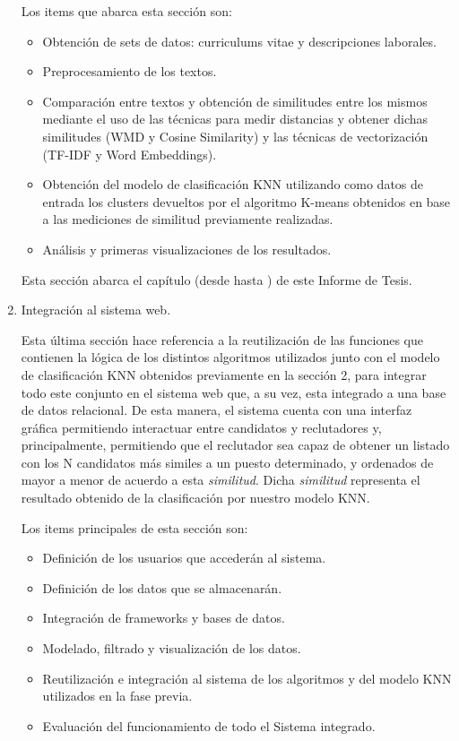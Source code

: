 \documentclass[12pt,a4paper]{article}
\begin{document}
\begin{sloppypar}
\begin{enumerate}
\cleardoublepage    %

Los items que abarca esta sección son:

\begin{itemize}
	\item Obtención de sets de datos: curriculums vitae y descripciones laborales. 
	\item Preprocesamiento de los textos.
	\item Comparación entre textos y obtención de similitudes entre los mismos mediante el uso de las técnicas para medir distancias y obtener dichas similitudes (WMD y Cosine Similarity) y las técnicas de vectorización (TF-IDF y Word Embeddings).
	\item Obtención del modelo de clasificación KNN utilizando como datos de entrada los clusters devueltos por el algoritmo K-means obtenidos en base a las mediciones de similitud previamente realizadas.
	\item Análisis y primeras visualizaciones de los resultados.
\end{itemize} 
 
Esta sección abarca el capítulo \textit{} (desde \textit{} hasta \textit{}) de este Informe de Tesis. \\

\item Integración al sistema web.

Esta última sección hace referencia a la reutilización de las funciones que contienen la lógica de los distintos algoritmos utilizados junto con el modelo de clasificación KNN obtenidos previamente en la sección 2, para integrar todo este conjunto en el sistema web que, a su vez, esta integrado a una base de datos relacional. De esta manera, el sistema cuenta con una interfaz gráfica permitiendo interactuar entre candidatos y reclutadores y, principalmente, permitiendo que el reclutador sea capaz de obtener un listado con los N candidatos más similes a un puesto determinado, y ordenados de mayor a menor de acuerdo a esta \textit{similitud}. Dicha \textit{similitud} representa el resultado obtenido de la clasificación por nuestro modelo KNN. 

Los items principales de esta sección son:
\begin{itemize}
	\item Definición de los usuarios que accederán al sistema.
	\item Definición de los datos que se almacenarán.
	\item Integración de frameworks y bases de datos.  
	\item Modelado, filtrado y visualización de los datos.
	\item Reutilización e integración al sistema de los algoritmos y del modelo KNN utilizados en la fase previa.	
	\item Evaluación del funcionamiento de todo el Sistema integrado.
\end{itemize} 


\end{enumerate}
\end{sloppypar}
\end{document}
